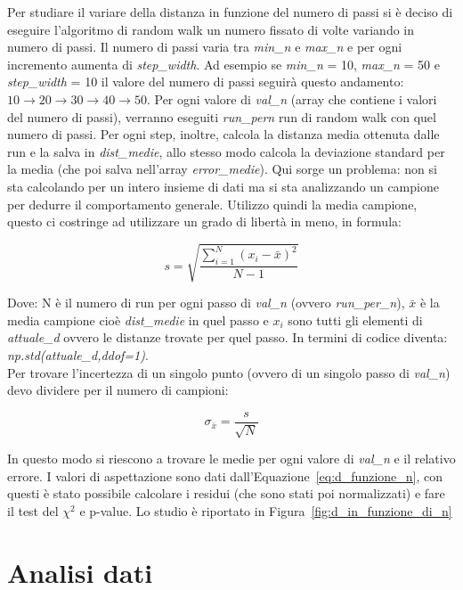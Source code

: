 \documentclass[a4paper,12pt]{article}
\begin{document}
Per studiare il variare della distanza in funzione del numero di passi si è deciso di eseguire l'algoritmo di random walk un numero fissato di volte variando in numero di passi. Il numero di passi varia tra \textit{min\_n} e \textit{max\_n} e per ogni incremento aumenta di \textit{step\_width}.
Ad esempio se \textit{min\_n} = 10, \textit{max\_n} = 50 e \textit{step\_width} = 10 il valore del numero di passi seguirà questo andamento: $10 \rightarrow 20 \rightarrow 30 \rightarrow 40 \rightarrow 50$. Per ogni valore di \textit{val\_n} (array che contiene i valori del numero di passi), verranno eseguiti \textit{run\_per\-n} run di random walk con quel numero di passi.
Per ogni step, inoltre, calcola la distanza media ottenuta dalle run e la salva in \textit{dist\_medie}, allo stesso modo calcola la deviazione standard per la media (che poi salva nell'array \textit{error\_medie}). Qui sorge un problema: non si sta calcolando per un intero insieme di dati ma si sta analizzando un campione per dedurre il comportamento generale. Utilizzo quindi la media campione, questo ci costringe ad utilizzare un grado di libertà in meno, in formula:

\begin{equation}
    s = \sqrt{\dfrac{\sum_{i=1}^{N}{(x_i-\bar{x})}^2}{N-1}}
\end{equation}

Dove: N è il numero di run per ogni passo di \textit{val\_n} (ovvero \textit{run\_per\_n}), $\bar{x}$ è la media campione cioè \textit{dist\_medie} in quel passo e $x_i$ sono tutti gli elementi di \textit{attuale\_d} ovvero le distanze trovate per quel passo.
In termini di codice diventa: \textit{np.std(attuale\_d,ddof=1)}.\\
Per trovare l'incertezza di un singolo punto (ovvero di un singolo passo di \textit{val\_n}) devo dividere per il numero di campioni:

\begin{equation}
    \sigma_{\bar{x}} = \dfrac{s}{\sqrt{N}}
\end{equation}

In questo modo si riescono a trovare le medie per ogni valore di \textit{val\_n} e il relativo errore. I valori di aspettazione sono dati dall'Equazione~\ref{eq:d_funzione_n}, con questi è stato possibile calcolare i residui (che sono stati poi normalizzati) e fare il test del $\chi^2$ e p-value. Lo studio è riportato in Figura~\ref{fig:d_in_funzione_di_n}

\section{Analisi dati}
\end{document}
